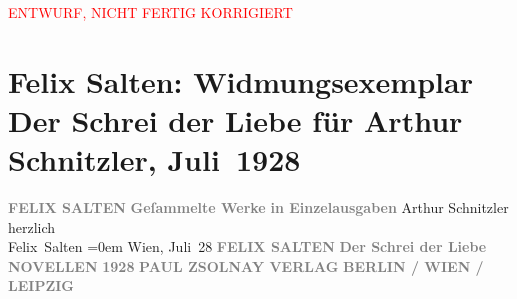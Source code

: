 
\begin{center}
            \textcolor{red}{ENTWURF, NICHT FERTIG KORRIGIERT}
                      \end{center}
            
         \renewcommand{\erwaehnteInstitutionen}{Institutionen: Paul Zsolnay Verlag}
         \renewcommand{\erwaehnteOrte}{Orte: Berlin, Leipzig, Wien}
         \renewcommand{\erwaehnteWerke}{Werke: Der Schrei der Liebe. Novellen}
               \section[Felix Salten: Widmungsexemplar Der Schrei der Liebe für Arthur Schnitzler, Juli 1928]{ Felix Salten: Widmungsexemplar Der Schrei der Liebe für Arthur Schnitzler,
               Juli 1928}\nopagebreak{}\rehead{ }\begin{ledgroupsized}[t]{13cm}\normalsize\beginnumbering \toendnotes[C]{\smallbreak\pagebreak[2]} 
\pstart
           \noindent{}\centering{}{\pb}\textcolor{gray}{\textbf{FELIX SALTEN}}\pend
           \pstart
           \noindent{}\centering{}\textcolor{gray}{\textbf{Geſammelte Werke}}\pend
           \pstart
           \noindent{}\centering{}\textcolor{gray}{\textbf{in Einzelausgaben}}\pend
           \pstart
           \noindent{}Arthur Schnitzler\pend
           \pstart
           herzlich{\\[\baselineskip]}\spacefill\mbox{Felix Salten}\pend
           \leftskip=0em{}\pstart
           Wien, 
                  Juli 28\pend
           {\bigskip}\pstart
           \noindent{}\centering{}{\pb}\textcolor{gray}{\textbf{FELIX SALTEN}}\pend
           \pstart
           \noindent{}\centering{}\textcolor{gray}{\textbf{Der Schrei der Liebe}}\pend
           \pstart
           \noindent{}\centering{}\textcolor{gray}{\textbf{NOVELLEN}}\pend
           {\bigskip}\pstart
           \noindent{}\centering{}\textcolor{gray}{\textbf{1928}}\pend
           \pstart
           \noindent{}\centering{}\textcolor{gray}{\textbf{PAUL ZSOLNAY VERLAG}}\pend
           \pstart
           \noindent{}\centering{}\textcolor{gray}{\textbf{BERLIN / WIEN / LEIPZIG}}\pend
           
         
         \endnumbering{}\end{ledgroupsized}\begin{anhang}\end{anhang}\newcommand{\dateiname}{L03044}\newcommand{\titel}{Felix Salten: Widmungsexemplar Der Schrei der Liebe für Arthur Schnitzler, Juli 1928}\newcommand{\editorInnen}{Martin Anton Müller und Laura Untner}
      